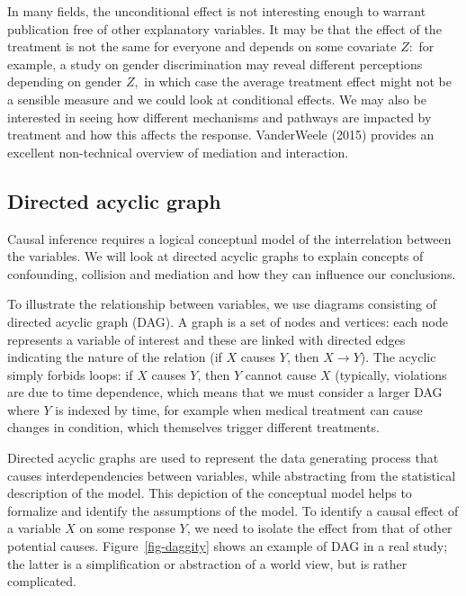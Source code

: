 \documentclass[
  11pt,
  letterpaper,
]{scrbook}
\theoremstyle{definition}
\theoremstyle{definition}
\theoremstyle{remark}
\begin{document}
In many fields, the unconditional effect is not interesting enough to
warrant publication free of other explanatory variables. It may be that
the effect of the treatment is not the same for everyone and depends on
some covariate \(Z:\) for example, a study on gender discrimination may
reveal different perceptions depending on gender \(Z,\) in which case
the average treatment effect might not be a sensible measure and we
could look at conditional effects. We may also be interested in seeing
how different mechanisms and pathways are impacted by treatment and how
this affects the response. VanderWeele (2015) provides an excellent
non-technical overview of mediation and interaction.

\subsection{Directed acyclic graph}\label{directed-acyclic-graph}

Causal inference requires a logical conceptual model of the
interrelation between the variables. We will look at directed acyclic
graphs to explain concepts of confounding, collision and mediation and
how they can influence our conclusions.

To illustrate the relationship between variables, we use diagrams
consisting of directed acyclic graph (DAG). A graph is a set of nodes
and vertices: each node represents a variable of interest and these are
linked with directed edges indicating the nature of the relation (if
\(X\) causes \(Y\), then \(X \to Y\)). The acyclic simply forbids loops:
if \(X\) causes \(Y\), then \(Y\) cannot cause \(X\) (typically,
violations are due to time dependence, which means that we must consider
a larger DAG where \(Y\) is indexed by time, for example when medical
treatment can cause changes in condition, which themselves trigger
different treatments.

Directed acyclic graphs are used to represent the data generating
process that causes interdependencies between variables, while
abstracting from the statistical description of the model. This
depiction of the conceptual model helps to formalize and identify the
assumptions of the model. To identify a causal effect of a variable
\(X\) on some response \(Y\), we need to isolate the effect from that of
other potential causes. Figure~\ref{fig-daggity} shows an example of DAG
in a real study; the latter is a simplification or abstraction of a
world view, but is rather complicated.
\end{document}
